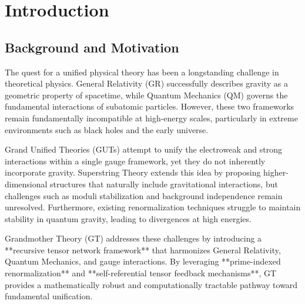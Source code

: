 \documentclass{article}
\theoremstyle{plain}
\begin{document}
\section{Introduction}

\subsection{Background and Motivation}
The quest for a unified physical theory has been a longstanding challenge in theoretical physics. General Relativity (GR) successfully describes gravity as a geometric property of spacetime, while Quantum Mechanics (QM) governs the fundamental interactions of subatomic particles. However, these two frameworks remain fundamentally incompatible at high-energy scales, particularly in extreme environments such as black holes and the early universe.

Grand Unified Theories (GUTs) attempt to unify the electroweak and strong interactions within a single gauge framework, yet they do not inherently incorporate gravity. Superstring Theory extends this idea by proposing higher-dimensional structures that naturally include gravitational interactions, but challenges such as moduli stabilization and background independence remain unresolved. Furthermore, existing renormalization techniques struggle to maintain stability in quantum gravity, leading to divergences at high energies.

Grandmother Theory (GT) addresses these challenges by introducing a **recursive tensor network framework** that harmonizes General Relativity, Quantum Mechanics, and gauge interactions. By leveraging **prime-indexed renormalization** and **self-referential tensor feedback mechanisms**, GT provides a mathematically robust and computationally tractable pathway toward fundamental unification.
\end{document}
